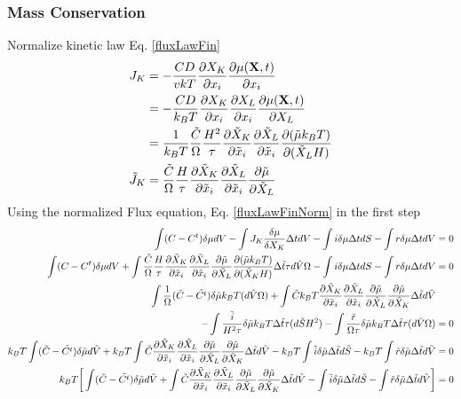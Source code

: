 \documentclass[12pt,3p]{article}
\numberwithin{equation}{section}
\begin{document}
\subsubsection{Mass Conservation} 
Normalize kinetic law Eq. \ref{fluxLawFin}
\begin{align}\label{fluxLawFinNorm}
\begin{split}
J_K &= - \frac{CD}{vkT} \pdv{X_K}{x_i} \pdv{\mu (\mathbf{X}, t)}{x_i}  \\
       &= - \frac{CD}{k_B T} \pdv{X_K}{x_i} \pdv{X_L}{x_i}  \pdv{\mu (\mathbf{X}, t)}{X_L} \\
       &= \frac{1}{k_B T} \frac{\tilde{C}}{\Omega} \frac{H^2}{\tau} \pdv{\tilde{X}_K}{\tilde{x}_i} \pdv{\tilde{X}_L}{\tilde{x}_i}  \pdv{ (\tilde{\mu} k_B T)  }{ (\tilde{X}_L H) } \\
\tilde{J}_K &= \frac{\tilde{C}}{\Omega} \frac{H}{\tau} \pdv{\tilde{X}_K}{\tilde{x}_i} \pdv{\tilde{X}_L}{\tilde{x}_i}  \pdv{\tilde{\mu}}{\tilde{X}_L} 
\end{split}
\end{align}
Using the normalized Flux equation, Eq. \ref{fluxLawFinNorm} in the first step 
\begin{align*}
\int (C - C^t) \delta \mu dV - \int J_K \frac{\delta \mu}{\delta X_K} \Delta t dV - \int i \delta \mu \Delta t dS - \int r \delta \mu \Delta t dV &= 0 \\
\int (C - C^t) \delta \mu dV + \int \frac{\tilde{C}}{\Omega} \frac{H}{\tau} \pdv{\tilde{X}_K}{\tilde{x}_i} \pdv{\tilde{X}_L}{\tilde{x}_i} \pdv{\tilde{\mu}}{\tilde{X}_L} \pdv{(\tilde{\mu} k_B T)}{(\tilde{X}_K H) } \Delta \tilde{t} \tau d \tilde{V} \Omega - \int i \delta \mu \Delta t dS - \int r \delta \mu \Delta t dV &= 0 \\ 
\int \frac{1}{\Omega} (\tilde{C} - \tilde{C^t}) \delta \tilde{\mu} k_B T (d\tilde{V} \Omega) + \int \tilde{C} k_B T \pdv{\tilde{X}_K}{\tilde{x}_i} \pdv{\tilde{X}_L}{\tilde{x}_i} \pdv{\tilde{\mu}}{\tilde{X}_L} \pdv{\tilde{\mu}}{\tilde{X}_K} \Delta \tilde{t} d \tilde{V} & \\ 
- \int \frac{\tilde{i}}{H^2 \tau} \delta \tilde{\mu} k_B T \Delta \tilde{t} \tau (d \tilde{S} H^2) - \int \frac{\tilde{r}}{\Omega \tau} \delta \tilde{\mu} k_B T \Delta \tilde{t} \tau (d\tilde{V} \Omega) &= 0 \\ 
k_B T \int (\tilde{C} - \tilde{C^t}) \delta \tilde{\mu} d\tilde{V} + k_B T \int \tilde{C} \pdv{\tilde{X}_K}{\tilde{x}_i} \pdv{\tilde{X}_L}{\tilde{x}_i} \pdv{\tilde{\mu}}{\tilde{X}_L} \pdv{\tilde{\mu}}{\tilde{X}_K} \Delta \tilde{t} d \tilde{V}  - k_B T \int \tilde{i} \delta \tilde{\mu} \Delta \tilde{t} d \tilde{S} - k_B T \int \tilde{r} \delta \tilde{\mu} \Delta \tilde{t} d \tilde{V} &= 0 \\
k_B T \bigg[ \int (\tilde{C} - \tilde{C^t}) \delta \tilde{\mu} d\tilde{V} + \int \tilde{C} \pdv{\tilde{X}_K}{\tilde{x}_i} \pdv{\tilde{X}_L}{\tilde{x}_i} \pdv{\tilde{\mu}}{\tilde{X}_L} \pdv{\tilde{\mu}}{\tilde{X}_K} \Delta \tilde{t} d \tilde{V} -  \int \tilde{i} \delta \tilde{\mu} \Delta \tilde{t} d \tilde{S} - \int \tilde{r} \delta \tilde{\mu} \Delta \tilde{t} d \tilde{V} \bigg] &= 0 
\end{align*}
\end{document}
